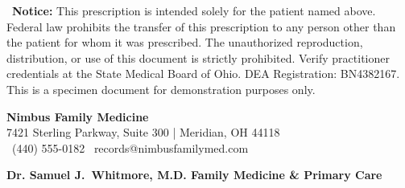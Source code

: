 \documentclass[12pt,letterpaper]{article}
\begin{document}
\vspace{6pt}

\begin{tcolorbox}[
  colback=rxblue!6,
  colframe=rxblue!30,
  sharp corners,
  boxrule=0.5pt,
  left=12pt,
  right=12pt,
  top=8pt,
  bottom=8pt,
  before skip=4pt,
  after skip=2pt
]
{\footnotesize\color{rxgray}\faExclamationTriangle\ \textbf{Notice:} This prescription is intended solely for the patient named above. Federal law prohibits the transfer of this prescription to any person other than the patient for whom it was prescribed. The unauthorized reproduction, distribution, or use of this document is strictly prohibited. Verify practitioner credentials at the State Medical Board of Ohio. DEA Registration: BN4382167. This is a specimen document for demonstration purposes only.}
\end{tcolorbox}

\newpage

\begin{rxheader}
\begin{minipage}[t]{0.72\linewidth}
  {\LARGE\bfseries\color{rxblue}Nimbus Family Medicine}\\[3pt]
  {\small\color{rxgray}7421 Sterling Parkway, Suite 300 \hspace{1em} | \hspace{1em} Meridian, OH 44118}\\[2pt]
  {\small\color{rxgray}\faPhone\ (440) 555-0182 \hspace{2em} \faEnvelope\ records@nimbusfamilymed.com}
\end{minipage}
\hfill
\begin{minipage}[t]{0.25\linewidth}
  \flushright
\end{minipage}

\vspace{6pt}
{\centering\small\color{rxaccent}\textbf{Dr. Samuel J.\ Whitmore, M.D. \hspace{1.5em} \textbar \hspace{1.5em} Family Medicine \& Primary Care}\par}
\end{rxheader}
\end{document}
